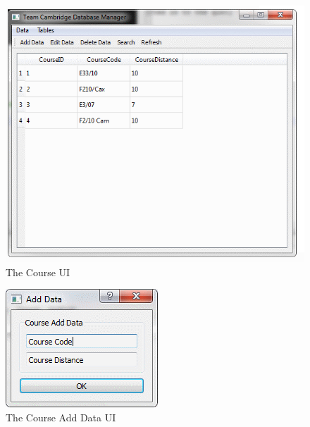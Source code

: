 \begin{figure}
\includegraphics[width=\textwidth]{./Maintenance/UI/Course.png}
\caption{The Course UI} \label{fig:Course_UI}
\end{figure}

\begin{figure}
\includegraphics[width=\textwidth]{./Maintenance/UI/CourseAD.png}
\caption{The Course Add Data UI} \label{fig:CourseAD_UI}
\end{figure}


